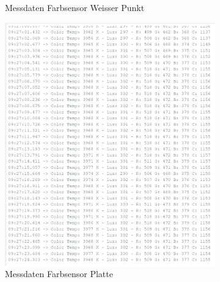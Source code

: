\documentclass[../main.tex]{subfiles}
\begin{document}
\begin{figure}[H]
\begin{subfigure}{0.45\textwidth}
        \caption{Messdaten Farbsensor Weisser Punkt}
        \label{fig:MDFarbsensorWeisserPunkt}
    \end{subfigure}
    
    \vspace{0.5cm}

    \begin{subfigure}{0.45\textwidth}
        \centering
        \includegraphics[width=\linewidth]{img/sensortest/MD_RotePlatte.png}
        \caption{Messdaten Farbsensor Platte}
        \label{fig:MDFarbsensorPlatte}
    \end{subfigure}
    \begin{subfigure}{0.45\textwidth}
        \centering

\end{subfigure}
\end{figure}
\end{document}
